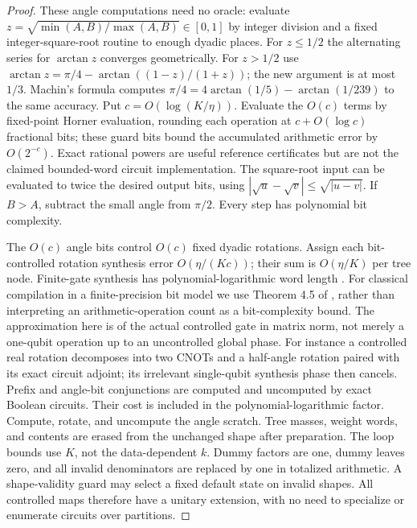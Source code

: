 \documentclass[11pt]{article}
\theoremstyle{definition}
\DeclareMathOperator{\atan}{arctan}
\begin{document}
\begin{proof}
These angle computations need no oracle: evaluate
$z=\sqrt{\min(A,B)/\max(A,B)}\in[0,1]$ by integer division and a fixed
integer-square-root routine to enough dyadic places. For $z\le1/2$ the
alternating series for $\atan z$ converges geometrically. For $z>1/2$ use
$\atan z=\pi/4-\atan((1-z)/(1+z))$; the new argument is at most $1/3$.
Machin's formula computes $\pi/4=4\atan(1/5)-\atan(1/239)$ to the same
accuracy. Put $c=O(\log(K/\eta))$. Evaluate the $O(c)$ terms by fixed-point
Horner evaluation, rounding each operation at $c+O(\log c)$ fractional
bits; these guard bits bound the accumulated arithmetic error by $O(2^{-c})$.
Exact rational powers are useful reference certificates but are not the
claimed bounded-word circuit implementation.
The square-root input can be evaluated to twice the desired output bits,
using $|\sqrt u-\sqrt v|\le\sqrt{|u-v|}$. If $B>A$, subtract the small
angle from $\pi/2$. Every step has polynomial bit complexity.

The $O(c)$ angle bits control $O(c)$ fixed dyadic rotations. Assign each
bit-controlled rotation synthesis error $O(\eta/(Kc))$; their sum is
$O(\eta/K)$ per tree node. Finite-gate synthesis has
polynomial-logarithmic word length \cite{sk}. For classical compilation
in a finite-precision bit model we use Theorem 4.5 of \cite{mw}, rather
than interpreting an arithmetic-operation count as a bit-complexity bound.
The approximation here is of the actual controlled gate in matrix norm,
not merely a one-qubit operation up to an uncontrolled global phase.
For instance a controlled real rotation decomposes into two CNOTs and a
half-angle rotation paired with its exact circuit adjoint; its irrelevant
single-qubit synthesis phase then cancels. Prefix and angle-bit conjunctions
are computed and uncomputed by exact Boolean circuits. Their cost is
included in the polynomial-logarithmic factor.
Compute, rotate, and uncompute the angle
scratch. Tree masses, weight words, and contents are erased from the
unchanged shape after preparation. The loop bounds use $K$, not the
data-dependent $k$. Dummy factors are one, dummy leaves zero, and all
invalid denominators are replaced by one in totalized arithmetic. A
shape-validity guard may select a fixed default state on invalid shapes.
All controlled maps therefore have a unitary extension, with no need to
specialize or enumerate circuits over partitions.
\end{proof}
\end{document}
